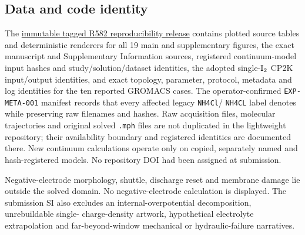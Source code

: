 \documentclass[11pt]{article}
\let\SIorigsubsection\subsection
\renewcommand{\subsection}{\FloatBarrier\SIorigsubsection}
\begin{document}
\subsection{Data and code identity}

The \href{https://github.com/ccyyyYyzz/ZIFB000/tree/r582-zifb-positive-electrode-reproducibility-v1/R582_PUBLICATION_REPRODUCIBILITY}{immutable tagged R582 reproducibility release} contains
plotted source tables and deterministic renderers for all 19 main and supplementary figures,
the exact manuscript and Supplementary Information sources, registered continuum-model input hashes and
study/solution/dataset identities, the adopted single-$\ce{I2}$ CP2K input/output identities, and exact
topology, parameter, protocol, metadata and log identities for the ten reported GROMACS cases. The
operator-confirmed \texttt{EXP-META-001} manifest records that every affected legacy \texttt{NH4Cl}/
\texttt{NH4CL} label denotes  while preserving raw filenames and hashes. Raw acquisition files,
molecular trajectories and original solved \texttt{.mph} files are not duplicated in the lightweight
repository; their availability boundary and registered identities are documented there. New continuum
calculations operate only on copied, separately named and hash-registered models. No repository DOI had
been assigned at submission.

Negative-electrode morphology, shuttle, discharge reset and membrane damage lie outside the solved domain.
No negative-electrode calculation is displayed. The submission SI also excludes an internal-overpotential
decomposition, unrebuildable single- charge-density artwork, hypothetical electrolyte extrapolation and
far-beyond-window mechanical or hydraulic-failure narratives.



\end{document}
